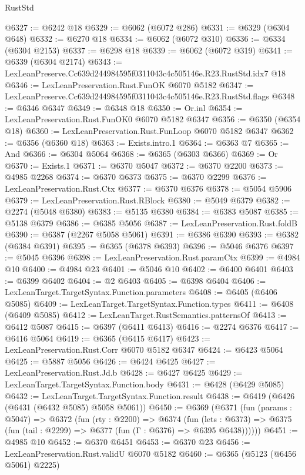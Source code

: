 \begin{lexlean}{RustStd}
\begin{coremodule}
@6327 := @6242 @18
@6329 := @6062 (@6072 @286)
@6331 := @6329 (@6304 @648)
@6332 := @6270 @18
@6334 := @6062 (@6072 @310)
@6336 := @6334 (@6304 @2153)
@6337 := @6298 @18
@6339 := @6062 (@6072 @319)
@6341 := @6339 (@6304 @2174)
@6343 := LexLeanPreserve.Cc639d244984595f0311043c4c505146e.R23.RustStd.idx7 @18
@6346 := LexLeanPreservation.Rust.FunOK @6070 @5182
@6347 := LexLeanPreserve.Cc639d244984595f0311043c4c505146e.R23.RustStd.flags
@6348 := @6346 @6347
@6349 := @6348 @18
@6350 := Or.inl
@6354 := LexLeanPreservation.Rust.FunOK0 @6070 @5182 @6347
@6356 := @6350 (@6354 @18)
@6360 := LexLeanPreservation.Rust.FunLoop @6070 @5182 @6347
@6362 := @6356 (@6360 @18)
@6363 := Exists.intro.{1}
@6364 := @6363 @7
@6365 := And
@6366 := @6304 @5064
@6368 := @6365 (@6303 @6366)
@6369 := Or
@6370 := Exists.{1}
@6371 := @6370 @5047
@6372 := @6370 @2200
@6373 := @4985 @2268
@6374 := @6370 @6373
@6375 := @6370 @2299
@6376 := LexLeanPreservation.Rust.Ctx
@6377 := @6370 @6376
@6378 := @5054 @5906
@6379 := LexLeanPreservation.Rust.RBlock
@6380 := @5049 @6379
@6382 := @2274 (@5048 @6380)
@6383 := @5135 @6380
@6384 := @6383 @5087
@6385 := @5138 @6379
@6386 := @6385 @5056
@6387 := LexLeanPreservation.Rust.foldB
@6390 := @6387 (@2267 @5058 @5061)
@6391 := @6386 @6390
@6393 := @6382 (@6384 @6391)
@6395 := @6365 (@6378 @6393)
@6396 := @5046 @6376
@6397 := @5045 @6396
@6398 := LexLeanPreservation.Rust.paramCtx
@6399 := @4984 @10
@6400 := @4984 @23
@6401 := @5046 @10
@6402 := @6400 @6401
@6403 := @6399 @6402
@6404 := @2 @6403
@6405 := @6398 @6404
@6406 := LexLeanTarget.TargetSyntax.Function.parameters
@6408 := @6405 (@6406 @5085)
@6409 := LexLeanTarget.TargetSyntax.Function.types
@6411 := @6408 (@6409 @5085)
@6412 := LexLeanTarget.RustSemantics.patternsOf
@6413 := @6412 @5087
@6415 := @6397 (@6411 @6413)
@6416 := @2274 @6376
@6417 := @6416 @5064
@6419 := @6365 (@6415 @6417)
@6423 := LexLeanPreservation.Rust.Corr @6070 @5182 @6347
@6424 := @6423 @5064
@6425 := @5887 @5056
@6426 := @6424 @6425
@6427 := LexLeanPreservation.Rust.Jd.b
@6428 := @6427 @6425
@6429 := LexLeanTarget.TargetSyntax.Function.body
@6431 := @6428 (@6429 @5085)
@6432 := LexLeanTarget.TargetSyntax.Function.result
@6438 := @6419 (@6426 (@6431 (@6432 @5085) @5058 @5061))
@6450 := @6369
    (@6371
      (fun (params : @5047) =>
      @6372
        (fun (rty : @2200) =>
        @6374
          (fun (lets : @6373) =>
          @6375 (fun (tail : @2299) => @6377 (fun (Γ : @6376) => @6395 @6438))))))
@6451 := @4985 @10
@6452 := @6370 @6451
@6453 := @6370 @23
@6456 := LexLeanPreservation.Rust.validU @6070 @5182
@6460 := @6365 (@5123 (@6456 @5061) @2225)

\end{coremodule}
\end{lexlean}
